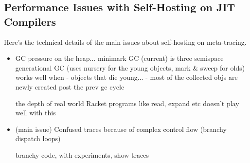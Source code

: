 \subsection{Performance Issues with Self-Hosting on JIT Compilers}
\label{subsec:performance}


Here's the technical details of the main issues about self-hosting on
meta-tracing.

\begin{itemize}
\item GC pressure on the heap... minimark GC (current) is three semispace generational GC (uses nursery for the young objects, mark \& sweep for olds)
  works well when
  - objects that die young...
  - most of the collected objs are newly created post the prev gc cycle


  the depth of real world Racket programs like
  read, expand etc doesn't play well with this

\item (main issue) Confused traces because of complex control flow
  (branchy dispatch loops)

  branchy code, with experiments, show traces
  
\end{itemize}

